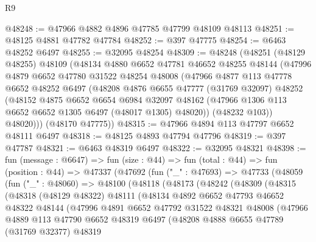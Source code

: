 \begin{lexlean}{R9}
\begin{coremodule}
@48248 := @47966 @4882 @4896 @47785 @47799 @48109 @48113
@48251 := @48125 @4881 @47782 @47784
@48252 := @397 @47775
@48254 := @6463 @48252 @6497
@48255 := @32095 @48254
@48309 := @48248
    (@48251
      (@48129 @48255)
      @48109
      (@48134
        @4880
        @6652
        @47781
        @46652
        @48255
        @48144
        (@47996
          @4879
          @6652
          @47780
          @31522
          @48254
          @48008
          (@47966
            @4877
            @113
            @47778
            @6652
            @48252
            @6497
            (@48208
              @4876
              @6655
              @47777
              (@31769 @32097)
              @48252
              (@48152
                @4875
                @6652
                @6654
                @6984
                @32097
                @48162
                (@47966 @1306 @113 @6652 @6652 @1305 @6497 (@48017 @1305) @48020))
              (@48232 @103))
            @48020)))
      (@48170 @47775))
@48315 := @47966 @4894 @113 @47797 @6652 @48111 @6497
@48318 := @48125 @4893 @47794 @47796
@48319 := @397 @47787
@48321 := @6463 @48319 @6497
@48322 := @32095 @48321
@48398 := fun (message : @6647) =>
  fun (size : @44) =>
  fun (total : @44) =>
  fun (position : @44) =>
  @47337
    (@47692
      (fun ("_" : @47693) =>
      @47733
        (@48059
          (fun ("_" : @48060) =>
          @48100
            (@48118
              (@48173
                (@48242
                  (@48309
                    (@48315
                      (@48318
                        (@48129 @48322)
                        @48111
                        (@48134
                          @4892
                          @6652
                          @47793
                          @46652
                          @48322
                          @48144
                          (@47996
                            @4891
                            @6652
                            @47792
                            @31522
                            @48321
                            @48008
                            (@47966
                              @4889
                              @113
                              @47790
                              @6652
                              @48319
                              @6497
                              (@48208
                                @4888
                                @6655
                                @47789
                                (@31769 @32377)
                                @48319

\end{coremodule}
\end{lexlean}
